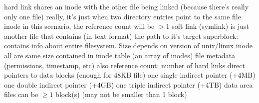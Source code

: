 \documentclass[12pt]{article}
\begin{document}
\begin{spacing}{0.8}
\begin{multicols*}{2}
\begin{flushleft}
\begin{outline}[longenum]
  \1 hard link shares an inode with the other file being linked
    (because there's really only one file)
    \2 really, it's just when two directory entries point to the same file inode
    \2 in this scenario, the reference count will be $>1$
  \1 soft link (symlink) is just another file that contains (in text format) the path to it's target
  \1 superblock: contains info about entire filesystem. Size depends on version of unix/linux
  \1 inode
    \2 all are same size
    \2 contained in inode table (an array of inodes)
    \2 file metadata (permissions, timestamp, etc)
      \3 also reference count: number of hard links
     direct pointers to data blocks (enough for 48KB file)
    \2 one single indirect pointer (+4MB)
    \2 one double indirect pointer (+4GB)
    \2 one triple indirect pointer (+4TB)
  \1 data area
    \2 files can be $\geq 1$ block(s) (may not be smaller than 1 block)












\end{outline}
\end{flushleft}
\end{multicols*}
\end{spacing}
\end{document}
